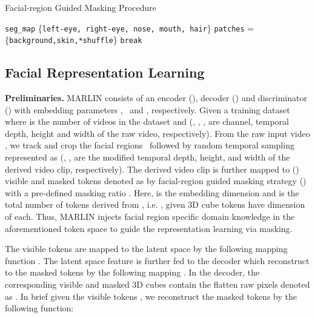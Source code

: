 \documentclass[10pt,twocolumn,letterpaper]{article}
\newcommand{\encoderparam}{}
\newcommand{\decoderparam}{}
\newcommand{\discriminatorparam}{}
\newcommand{\encoder}{}
\newcommand{\decoder}{}
\newcommand{\discriminator}{}
\newcommand{\fasking}{}
\begin{document}
\begin{algorithm}[tb]
\caption{Facial-region Guided Masking Procedure}
\label{alg:face}
\begin{algorithmic}[1]
\Require{, }
\State  \texttt{seg\_map}  
\State \{\texttt{left-eye, right-eye, nose, mouth, hair}\} 
\State  {}
\State  {}
\State  {}
\State\texttt{patches} =\{\texttt{background,skin,*\texttt{shuffle}}\} 
\State 
\If{} 
\State \texttt{break}
\EndIf
\EndFor
\State  {}
\end{algorithmic}
\end{algorithm}

\subsection{Facial Representation Learning}
\noindent \textbf{Preliminaries.} MARLIN consists of an encoder (\encoder), decoder (\decoder) and discriminator (\discriminator) with embedding parameters \encoderparam, \decoderparam\ and \discriminatorparam, respectively. Given a training dataset  where  is the number of videos in the dataset and  (, , ,  are channel, temporal depth, height and width of the raw video, respectively). From the raw input video , we track and crop the facial regions~\cite{wangFaceXZoo2021} followed by random temporal sampling represented as  (, ,  are the modified temporal depth, height, and width of the derived video clip, respectively). The derived video clip  is further mapped to () visible and  masked tokens denoted as  by facial-region guided masking strategy (\fasking) with a pre-defined masking ratio . Here,  is the embedding dimension and  is the total number of tokens derived from , i.e. , given 3D cube tokens have dimension of  each. Thus, MARLIN injects facial region specific domain knowledge in the aforementioned token space to guide the representation learning via masking. 

The visible tokens  are mapped to the latent space  by the following mapping function . The latent space feature  is further fed to the decoder  which reconstruct  to the  masked tokens  by the following mapping . In the decoder, the corresponding visible and masked 3D cubes contain the flatten raw pixels denoted as .
In brief given the visible tokens , we reconstruct the masked tokens by the following function:  
\vspace{-0mm}
 
\end{document}
